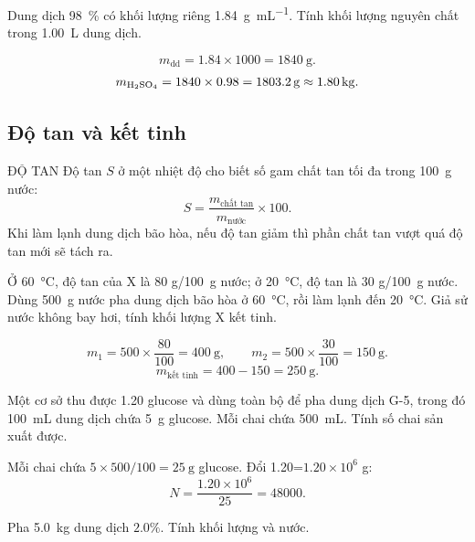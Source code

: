 \begin{vidu}
Dung dịch  \SI{98}{\percent} có khối lượng riêng \SI{1.84}{\gram\per\milli\liter}. Tính khối lượng  nguyên chất trong \SI{1.00}{\liter} dung dịch.
\end{vidu}
\begin{loigiai}
\[
m_{\text{dd}}=1.84\times1000=\SI{1840}{\gram}.
\]
\[
m_{\ce{H2SO4}}=1840\times0.98=\SI{1803.2}{\gram}\approx\SI{1.80}{\kilo\gram}.
\]
\end{loigiai}

\subsection{Độ tan và kết tinh}
\begin{ghinho}{ĐỘ TAN}
Độ tan \(S\) ở một nhiệt độ cho biết số gam chất tan tối đa trong \SI{100}{\gram} nước:
\[
S=\frac{m_{\text{chất tan}}}{m_{\text{nước}}}\times100.
\]
Khi làm lạnh dung dịch bão hòa, nếu độ tan giảm thì phần chất tan vượt quá độ tan mới sẽ tách ra.
\end{ghinho}

\begin{vidu}
Ở \SI{60}{\degreeCelsius}, độ tan của X là \(80\) g/\SI{100}{\gram} nước; ở \SI{20}{\degreeCelsius}, độ tan là \(30\) g/\SI{100}{\gram} nước. Dùng \SI{500}{\gram} nước pha dung dịch bão hòa ở \SI{60}{\degreeCelsius}, rồi làm lạnh đến \SI{20}{\degreeCelsius}. Giả sử nước không bay hơi, tính khối lượng X kết tinh.
\end{vidu}
\begin{loigiai}
\[
m_1=500\times\frac{80}{100}=\SI{400}{\gram},\qquad
m_2=500\times\frac{30}{100}=\SI{150}{\gram}.
\]
\[
m_{\text{kết tinh}}=400-150=\SI{250}{\gram}.
\]
\end{loigiai}

\begin{vidu}
Một cơ sở thu được \SI{1.20}{\ton} glucose và dùng toàn bộ để pha dung dịch G-5, trong đó \SI{100}{\milli\liter} dung dịch chứa \SI{5}{\gram} glucose. Mỗi chai chứa \SI{500}{\milli\liter}. Tính số chai sản xuất được.
\end{vidu}
\begin{loigiai}
Mỗi chai chứa \(5\times500/100=\SI{25}{\gram}\) glucose. Đổi \SI{1.20}{\ton}=\(1.20\times10^6\) g:
\[
N=\frac{1.20\times10^6}{25}=48000.
\]
\end{loigiai}

\begin{tuluyen}
Pha \SI{5.0}{\kilo\gram} dung dịch  \(2.0\%\). Tính khối lượng  và nước.
\end{tuluyen}

